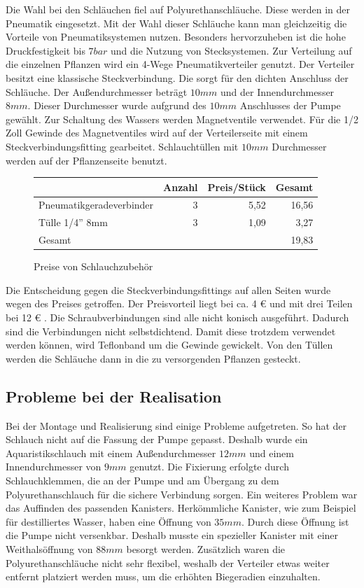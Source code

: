 Die Wahl bei den Schläuchen fiel auf Polyurethanschläuche. Diese werden in der Pneumatik eingesetzt.
Mit der Wahl dieser Schläuche kann man gleichzeitig die Vorteile von Pneumatiksystemen nutzen.
Besonders hervorzuheben ist die
hohe Druckfestigkeit bis $7 bar$ und die Nutzung von Stecksystemen. Zur Verteilung auf die einzelnen
Pflanzen wird ein 4-Wege Pneumatikverteiler genutzt. Der Verteiler besitzt eine klassische
Steckverbindung. Die sorgt für den
dichten Anschluss der Schläuche. Der Außendurchmesser beträgt $10mm$ und der Innendurchmesser $8mm$.
Dieser Durchmesser wurde aufgrund des $10mm$ Anschlusses der Pumpe gewählt.
Zur Schaltung des Wassers werden Magnetventile verwendet. Für die 1/2 Zoll Gewinde des Magnetventiles
wird auf der Verteilerseite mit einem Steckverbindungsfitting gearbeitet. Schlauchtüllen mit $10mm$
Durchmesser werden auf der Pflanzenseite benutzt.

\begin{figure}[ht]
    \centering
    \begin{tabular}{|l|r|r||r|}
        \hline
        & Anzahl & Preis/Stück & Gesamt \\\hline
        Pneumatikgeradeverbinder & 3 & 5,52 & 16,56 \\\hline
        Tülle 1/4'' 8mm & 3 & 1,09 & 3,27 \\\hline
        Gesamt & & & 19,83 \\\hline
    \end{tabular}
    \caption{Preise von Schlauchzubehör}
\end{figure}


Die Entscheidung gegen die Steckverbindungsfittings
auf allen Seiten wurde wegen des Preises getroffen.
Der Preisvorteil liegt bei ca. 4 \euro{} und mit drei Teilen bei 12 \euro{} .
Die Schraubverbindungen sind alle nicht konisch ausgeführt. Dadurch sind die Verbindungen nicht selbstdichtend. Damit diese trotzdem verwendet werden können, wird Teflonband um die Gewinde gewickelt. Von den Tüllen werden die
Schläuche dann in die zu versorgenden Pflanzen gesteckt.

\subsection{Probleme bei der Realisation}
Bei der Montage und Realisierung sind einige Probleme aufgetreten. So hat der Schlauch nicht auf
die Fassung der Pumpe gepasst. Deshalb wurde ein Aquaristikschlauch mit einem
Außendurchmesser $12mm$ und einem Innendurchmesser von
$9mm$ genutzt. Die Fixierung erfolgte durch Schlauchklemmen, die an der Pumpe und am Übergang
zu dem Polyurethanschlauch für die sichere Verbindung sorgen. Ein weiteres Problem war das
Auffinden des passenden Kanisters. Herkömmliche
Kanister, wie zum Beispiel für destilliertes Wasser, haben eine Öffnung von $35mm$. Durch diese
Öffnung ist die Pumpe nicht versenkbar. Deshalb musste ein spezieller Kanister mit einer
Weithalsöffnung von $88mm$ besorgt werden.
Zusätzlich waren die Polyurethanschläuche nicht sehr flexibel, weshalb der Verteiler etwas
weiter entfernt platziert werden muss, um die erhöhten Biegeradien einzuhalten.

